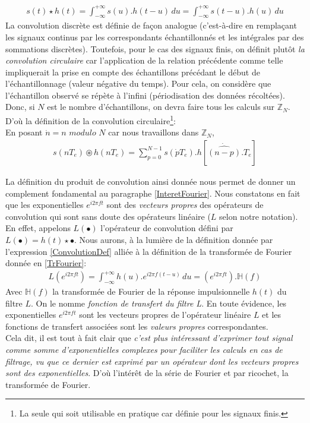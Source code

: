 \begin{eqnarray}\label{ConvolutionDef}
s(t)\star h(t) = \int_{-\infty}^{+\infty}s(u).h(t-u)\,du = \int_{-\infty}^{+\infty}s(t-u).h(u)\,du
\end{eqnarray}
La convolution discrète est définie de façon analogue (c'est-à-dire en remplaçant les signaux continus par les correspondants échantillonnés et les intégrales par des sommations discrètes). Toutefois, pour le cas des signaux finis, on définit plutôt \emph{la convolution circulaire} car l'application de la relation précédente comme telle impliquerait la prise en compte des échantillons précédant le début de l'échantillonnage (valeur négative du temps). Pour cela, on considère que l'échantillon observé se répète à l'infini (périodisation des données récoltées). Donc, si $ N $ est le nombre d'échantillons, on devra faire tous les calculs sur $ \mathbb{Z}_{N} $. D'où la définition\cite{TraitSignMath} de la convolution circulaire\footnote{La seule qui soit utilisable en pratique car définie pour les signaux finis.}:\\
En posant $ \dot{n} = n $ $ modulo $  $ N $ car nous travaillons dans $ \mathbb{Z}_{N} $,
\begin{eqnarray}\label{ConvolutionCirculaire}
s(nT_{e}) \circledast h(nT_{e}) = \sum_{p=0}^{N-1}s(\dot{p}T_{e}).h[\dot{\widehat{(n-p)}}.T_{e}]
\end{eqnarray}

La définition du produit de convolution ainsi donnée nous permet de donner un complement fondamental au paragraphe \ref{InteretFourier}. Nous constatons en fait que les exponentielles $ e^{i2 \pi ft} $ sont des \emph{vecteurs propres} des opérateurs de convolution qui sont sans doute des opérateurs linéaire ($ L $ selon notre notation).\\
En effet, appelons $ L(\bullet) $ l'opérateur de convolution défini par $ L(\bullet) = h(t) \star \bullet $. Nous aurons, à la lumière de la définition donnée par l'expression \ref{ConvolutionDef} alliée à la définition de la transformée de Fourier donnée en \ref{TrFourier}:
\begin{eqnarray}
L(e^{i2 \pi ft}) = \int_{-\infty}^{+\infty}h(u).e^{i2 \pi f(t-u)}\,du = (e^{i2 \pi ft}).\mathbb{H}(f)
\end{eqnarray}
Avec $ \mathbb{H}(f) $ la transformée de Fourier de la réponse impulsionnelle $ h(t) $ du filtre $ L $. On le nomme \emph{fonction de transfert du filtre L}. En toute évidence, les exponentielles $ e^{i2 \pi ft} $ sont les vecteurs propres de l'opérateur linéaire $ L $ et les fonctions de transfert associées sont les \emph{valeurs propres} correspondantes.\\
Cela dit, il est tout à fait clair que \emph{c'est plus intéressant d'exprimer tout signal comme somme d'exponentielles complexes pour faciliter les calculs en cas de filtrage, vu que ce dernier est exprimé par un opérateur dont les vecteurs propres sont des exponentielles}. D'où l'intérêt de la série de Fourier et par ricochet, la transformée de Fourier.
